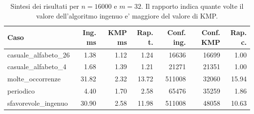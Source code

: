 \begin{table}[H]
\centering
\small
\begin{tabular}{lrrrrrr}
\toprule
Caso & Ing. ms & KMP ms & Rap. t. & Conf. ing. & Conf. KMP & Rap. c.\\
\midrule
casuale\_alfabeto\_26 & 1.38 & 1.12 & 1.24 & 16636 & 16699 & 1.00\\
casuale\_alfabeto\_4 & 1.68 & 1.39 & 1.21 & 21271 & 21351 & 1.00\\
molte\_occorrenze & 31.82 & 2.32 & 13.72 & 511008 & 32060 & 15.94\\
periodico & 4.40 & 1.70 & 2.58 & 65476 & 35259 & 1.86\\
sfavorevole\_ingenuo & 30.90 & 2.58 & 11.98 & 511008 & 48058 & 10.63\\
\bottomrule
\end{tabular}
\caption{Sintesi dei risultati per $n=16000$ e $m=32$. Il rapporto indica quante volte il valore dell'algoritmo ingenuo e' maggiore del valore di KMP.}
\label{tab:sintesi-16000-32}
\end{table}
